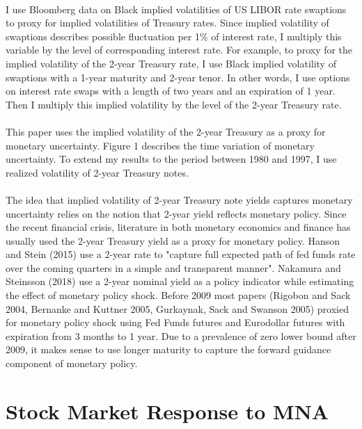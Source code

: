 \documentclass[12pt]{article}
\begin{document}
\paragraph{}
I use Bloomberg data on Black implied volatilities of US LIBOR rate swaptions to proxy for implied volatilities of Treasury rates. Since implied volatility of swaptions describes possible fluctuation per 1\% of interest rate, I multiply this variable by the level of corresponding interest rate. For example, to proxy for the implied volatility of the 2-year Treasury rate, I use Black implied volatility of swaptions with a 1-year maturity and 2-year tenor. In other words, I use options on interest rate swaps with a length of two years and an expiration of 1 year. Then I multiply this implied volatility by the level of the 2-year Treasury rate. 
\paragraph{}
This paper uses the implied volatility of the 2-year Treasury as a proxy for monetary uncertainty. Figure 1 describes the time variation of monetary uncertainty. To extend my results to the period between 1980 and 1997, I use realized volatility of 2-year Treasury notes.
\paragraph{}
The idea that implied volatility of 2-year Treasury note yields captures monetary uncertainty relies on the notion that 2-year yield reflects monetary policy. Since the recent financial crisis, literature in both monetary economics and finance has usually used the 2-year Treasury yield as a proxy for monetary policy. Hanson and Stein (2015) use a 2-year rate to "capture full expected path of fed funds rate over the coming quarters in a simple and transparent manner". Nakamura and Steinsson (2018) use a 2-year nominal yield as a policy indicator while estimating the effect of monetary policy shock. Before 2009 most papers (Rigobon and Sack 2004, Bernanke and Kuttner 2005, Gurkaynak, Sack and Swanson 2005) proxied for monetary policy shock using Fed Funds futures and Eurodollar futures with expiration from 3 months to 1 year. Due to a prevalence of zero lower bound after 2009, it makes sense to use longer maturity to capture the forward guidance component of monetary policy.
\\
[*** Add discussion of why I use uncertainty word ***]

\section{Stock Market Response to MNA} \label{sec:Model}
\end{document}
